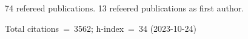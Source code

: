 74 refereed publications. 13 refeered publications as first author.

Total citations~=~3562; h-index~=~34 (2023-10-24)